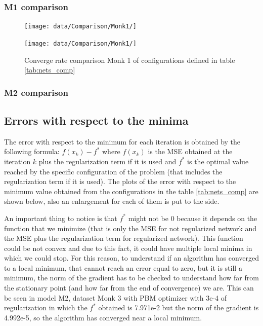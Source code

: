 \subsubsection{M1 comparison}


\begin{figure}[H]
	\centering
	\begin{minipage}[t]{0.5\linewidth}		\texttt{[image: data/Comparison/Monk1/]}
	\end{minipage}%
	\begin{minipage}[t]{0.5\linewidth}
		\texttt{[image: data/Comparison/Monk1/]}
	\end{minipage}
	\caption{Converge rate comparison Monk 1 of configurations defined in table \ref{tab:nets_comp}}
	\label{CR-Monk1}
\end{figure}

\subsubsection{M2 comparison}

\subsection{Errors with respect to the minima}
\label{sec:minimum_error}
The error with respect to the minimum for each iteration is obtained by the following formula: $ f(x_k) - f^*$ where  $f(x_{k})$ is the MSE obtained at the iteration $k$ plus the  regularization term if it is used and $f^*$ is the optimal value reached by the specific configuration of the problem (that includes the regularization term if it is used). The plots of the error with respect to the minimum value obtained from the configurations in the table \ref{tab:nets_comp} are shown below, also an enlargement for each of them is put to the side.

An important thing to notice is that $f^*$ might not be 0 because it depends on the function that we minimize (that is only the MSE for not regularized network and the MSE plus the regularization term for regularized network). This function could be not convex and due to this fact, it could have multiple local minima in which we could stop. For this reason, to understand if an algorithm has converged to a local minimum, that cannot reach an error equal to zero, but it is still a minimum, the norm of the gradient has to be checked to understand how far from the stationary point (and how far from the end of convergence) we are. This can be seen in model M2, dataset Monk 3 with PBM optimizer with 3e-4 of regularization in which the $f^*$ obtained is 7.971e-2 but the norm of the gradient is 4.992e-5, so the algorithm has converged near a local minimum.

